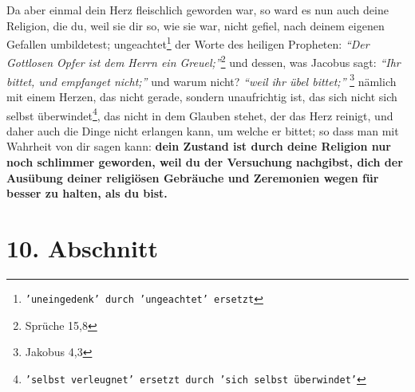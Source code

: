 \medskip

Da aber einmal dein Herz fleischlich geworden war, so ward es nun auch deine
Religion, die du, weil sie dir so, wie sie war, nicht gefiel, nach deinem
eigenen Gefallen umbildetest; ungeachtet\footnote{\texttt{'uneingedenk' durch
'ungeachtet' ersetzt}}
der Worte des heiligen Propheten:
\textit{"`Der Gottlosen Opfer ist dem Herrn ein Greuel;"'}\footnote{Sprüche
15,8}
 und
dessen, was Jacobus sagt:
\textit{"`Ihr bittet, und empfanget nicht;"'} und warum
nicht? \textit{"`weil ihr übel bittet;"'}
\footnote{Jakobus 4,3}
 nämlich mit einem
Herzen, das nicht gerade, sondern unaufrichtig ist, das sich nicht sich
selbst überwindet\footnote{\texttt{'selbst verleugnet' ersetzt durch 'sich
selbst überwindet'}},
das nicht in dem Glauben stehet, der das Herz reinigt,
und daher
auch die Dinge nicht erlangen kann, um welche er bittet; so dass man mit
Wahrheit von dir sagen kann: \label{ref:02_09_selbstueberschaetzung}
\textbf{dein Zustand ist durch deine Religion nur noch
schlimmer geworden, weil du der Versuchung nachgibst, dich der Ausübung
deiner religiösen Gebräuche und Zeremonien wegen für besser zu halten, als du
bist.}

\section{10. Abschnitt}  \label{kap2_ab10}

